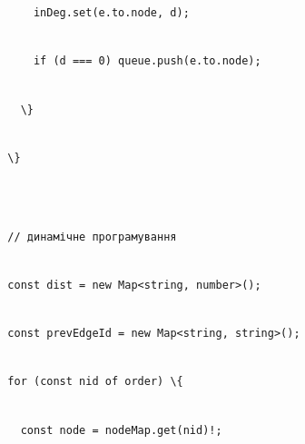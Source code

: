 \documentclass[
]{article}
\newcommand{\passthrough}[1]{#1}
\begin{document}
\passthrough{\lstinline!      !}\passthrough{\lstinline!inDeg.set!}\passthrough{\lstinline!(!}\passthrough{\lstinline!e.to.node!}\passthrough{\lstinline!,!}\passthrough{\lstinline! !}\passthrough{\lstinline!d);!}\strut \\
\passthrough{\lstinline!      !}\passthrough{\lstinline!if!}\passthrough{\lstinline! !}\passthrough{\lstinline!(d!}\passthrough{\lstinline! !}\passthrough{\lstinline!===!}\passthrough{\lstinline! !}\passthrough{\lstinline!0)!}\passthrough{\lstinline! !}\passthrough{\lstinline!queue.push!}\passthrough{\lstinline!(!}\passthrough{\lstinline!e.to.node!}\passthrough{\lstinline!);!}\strut \\
\passthrough{\lstinline!    !}\passthrough{\lstinline!\}!}\strut \\
\passthrough{\lstinline!  !}\passthrough{\lstinline!\}!}\strut \\
\strut \\
\passthrough{\lstinline!  !}\passthrough{\lstinline!//!}\passthrough{\lstinline! !}\passthrough{\lstinline!динамічне!}\passthrough{\lstinline! !}\passthrough{\lstinline!програмування!}\strut \\
\passthrough{\lstinline!  !}\passthrough{\lstinline!const!}\passthrough{\lstinline! !}\passthrough{\lstinline!dist!}\passthrough{\lstinline! !}\passthrough{\lstinline!=!}\passthrough{\lstinline! !}\passthrough{\lstinline!new!}\passthrough{\lstinline! !}\passthrough{\lstinline!Map<string,!}\passthrough{\lstinline! !}\passthrough{\lstinline!number>();!}\strut \\
\passthrough{\lstinline!  !}\passthrough{\lstinline!const!}\passthrough{\lstinline! !}\passthrough{\lstinline!prevEdgeId!}\passthrough{\lstinline! !}\passthrough{\lstinline!=!}\passthrough{\lstinline! !}\passthrough{\lstinline!new!}\passthrough{\lstinline! !}\passthrough{\lstinline!Map<string,!}\passthrough{\lstinline! !}\passthrough{\lstinline!string>();!}\strut \\
\passthrough{\lstinline!  !}\passthrough{\lstinline!for!}\passthrough{\lstinline! !}\passthrough{\lstinline!(const!}\passthrough{\lstinline! !}\passthrough{\lstinline!nid!}\passthrough{\lstinline! !}\passthrough{\lstinline!of!}\passthrough{\lstinline! !}\passthrough{\lstinline!order)!}\passthrough{\lstinline! !}\passthrough{\lstinline!\{!}\strut \\
\passthrough{\lstinline!    !}\passthrough{\lstinline!const!}\passthrough{\lstinline! !}\passthrough{\lstinline!node!}\passthrough{\lstinline! !}\passthrough{\lstinline!=!}\passthrough{\lstinline! !}\passthrough{\lstinline!nodeMap.get!}\passthrough{\lstinline!(!}\passthrough{\lstinline!nid!}\passthrough{\lstinline")!;"}\strut \\
\end{document}
